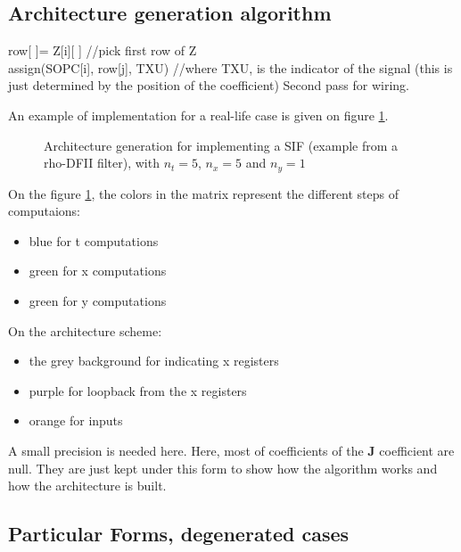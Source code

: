 \subsection{Architecture generation algorithm}

	\begin{algorithm}[H]
	 {
	 	row[ ]= Z[i][ ] //pick first row of Z \\
	 	 {
	 		assign(SOPC[i], row[j], TXU) //where TXU, is the indicator of the signal (this is just determined by the position of the coefficient)
	 	}
		Second pass for wiring.
	}
	\end{algorithm}

	An example of implementation for a real-life case is given on figure \ref{fig:SIFimpl}.

	\begin{figure}[!h]
	\begin{center}
	\scalebox{7}{}
	\end{center}
	\caption{ Architecture generation for implementing a SIF (example from a rho-DFII filter), with $n_t=5$, $n_x=5$ and $n_y=1$ \label{fig:SIFimpl}}
	\end{figure}

	On the figure \ref{fig:SIFimpl}, the colors in the matrix represent the different steps of computaions:
	\begin{itemize}
		\item blue for t computations
		\item green for x computations
		\item green for y computations
	\end{itemize}

	On the architecture scheme:
	\begin{itemize}
		\item the grey background for indicating x registers
		\item purple for loopback from the x registers
		\item orange for inputs
	\end{itemize}
	
	A small precision is needed here.
	Here, most of coefficients of the $\boldsymbol{J}$ coefficient are null.
	They are just kept under this form to show how the algorithm works and how the architecture is built.
	

\subsection{Particular Forms, degenerated cases}
